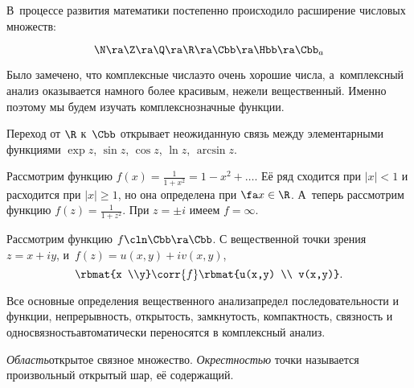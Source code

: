 \documentclass[a4paper]{article}
\begin{document}
В~процессе развития математики постепенно происходило расширение числовых множеств:

$$\N \ra \Z \ra \Q \ra \R \ra \Cbb \ra \Hbb \ra \Cbb_a$$

Было замечено, что комплексные числа\т это очень хорошие числа, а~комплексный анализ оказывается
намного более красивым, нежели вещественный. Именно поэтому мы будем изучать комплекснозначные функции.

Переход от $\R$ к~$\Cbb$ открывает неожиданную связь между элементарными функциями $\exp z$, $\sin z$, $\cos z$,
$\ln z$, $\arcsin z$.

Рассмотрим функцию $f(x) = \frac{1}{1+x^2} = 1 - x^2 + \ldots$. Её ряд сходится при $|x| < 1$ и расходится при
$|x| \ge 1$, но она определена при $\fa x \in \R$. А~теперь рассмотрим функцию $f(z) = \frac{1}{1+z^2}$. При
$z = \pm i$ имеем $f = \infty$.

Рассмотрим функцию $f\cln \Cbb \ra \Cbb$. С вещественной точки зрения $z = x + iy$,
и~$f(z) = u(x,y) + iv(x,y)$,  $$\rbmat{x \\y} \corr{f} \rbmat{u(x,y) \\ v(x,y)}.$$

Все основные определения вещественного анализа\т предел последовательности и функции, непрерывность, открытость,
замкнутость, компактность, связность и односвязность\т автоматически переносятся в комплексный анализ.

\begin{df}
\emph{Область}\т открытое связное множество. \emph{Окрестностью} точки называется произвольный открытый шар, её содержащий.
\end{df}
\end{document}
